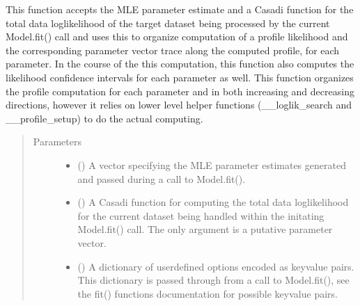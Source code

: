 \documentclass[letterpaper,10pt,english,openany,oneside]{sphinxmanual}
\begin{document}
\begin{fulllineitems}
\begin{fulllineitems}
This function accepts the MLE parameter estimate and a Casadi function for the total data
log\sphinxhyphen{}likelihood of the target dataset being processed by the current Model.fit() call
and uses this to organize computation of a profile likelihood and the corresponding
parameter vector trace along the computed profile, for each parameter. In the
course of the this computation, this function also computes the likelihood confidence
intervals for each parameter as well. This function organizes the profile computation for
each parameter and in both increasing and decreasing directions, however it relies on lower
level helper functions (\_\_loglik\_search and \_\_profile\_setup) to do the actual computing.
\begin{quote}\begin{description}
\item[{Parameters}] \leavevmode\begin{itemize}
\item {} 
 (\sphinxstyleliteralemphasis{\sphinxupquote{, }}) \textendash{} A vector specifying the MLE parameter estimates generated and
passed during a call to Model.fit().

\item {} 
 () \textendash{} A Casadi function for computing the total data log\sphinxhyphen{}likelihood
for the current dataset being handled within the initating Model.fit() call. The only
argument is a putative parameter vector.

\item {} 
 () \textendash{} A dictionary of user\sphinxhyphen{}defined options encoded as key\sphinxhyphen{}value
pairs. This dictionary is passed through from a call to Model.fit(), see
the fit() functions documentation for possible key\sphinxhyphen{}value pairs.

\end{itemize}


\end{description}
\end{quote}
\end{fulllineitems}
\end{fulllineitems}
\end{document}
